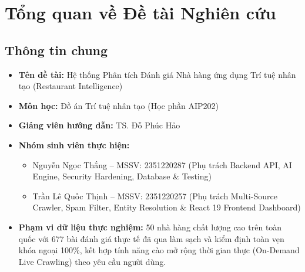 \documentclass[12pt, a4paper]{article}
\begin{document}
\clearpage
\section{Tổng quan về Đề tài Nghiên cứu}

\subsection{Thông tin chung}
\begin{itemize}[leftmargin=1.2cm]
    \item \textbf{Tên đề tài:} Hệ thống Phân tích Đánh giá Nhà hàng ứng dụng Trí tuệ nhân tạo (Restaurant Intelligence)
    \item \textbf{Môn học:} Đồ án Trí tuệ nhân tạo (Học phần AIP202)
    \item \textbf{Giảng viên hướng dẫn:} TS. Đỗ Phúc Hảo
    \item \textbf{Nhóm sinh viên thực hiện:}
    \begin{itemize}
        \item Nguyễn Ngọc Thắng -- MSSV: 2351220287 (Phụ trách Backend API, AI Engine, Security Hardening, Database \& Testing)
        \item Trần Lê Quốc Thịnh -- MSSV: 2351220257 (Phụ trách Multi-Source Crawler, Spam Filter, Entity Resolution \& React 19 Frontend Dashboard)
    \end{itemize}
    \item \textbf{Phạm vi dữ liệu thực nghiệm:} 50 nhà hàng chất lượng cao trên toàn quốc với 677 bài đánh giá thực tế đã qua làm sạch và kiểm định toàn vẹn khóa ngoại 100\%, kết hợp tính năng cào mở rộng thời gian thực (On-Demand Live Crawling) theo yêu cầu người dùng.
\end{itemize}
\end{document}
